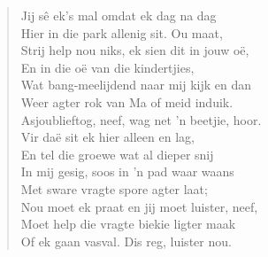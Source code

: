 \begin{verse}
Jij sê ek’s mal omdat ek dag na dag \\ 
Hier in die park allenig sit. Ou maat, \\ 
Strij help nou niks, ek sien dit in jouw oë, \\ 
En in die oë van die kindertjies, \\ 
Wat bang-meelijdend naar mij kijk en dan \\ 
Weer agter rok van Ma of meid induik. \\ 
Asjoublieftog, neef, wag net ’n beetjie, hoor. \\ 
Vir daë sit ek hier alleen en lag, \\ 
En tel die groewe wat al dieper snij \\ 
In mij gesig, soos in ’n pad waar waans \\ 
Met sware vragte spore agter laat; \\ 
Nou moet ek praat en jij moet luister, neef, \\ 
Moet help die vragte biekie ligter maak \\ 
Of ek gaan vasval. Dis reg, luister nou. \\ 
\end{verse}

